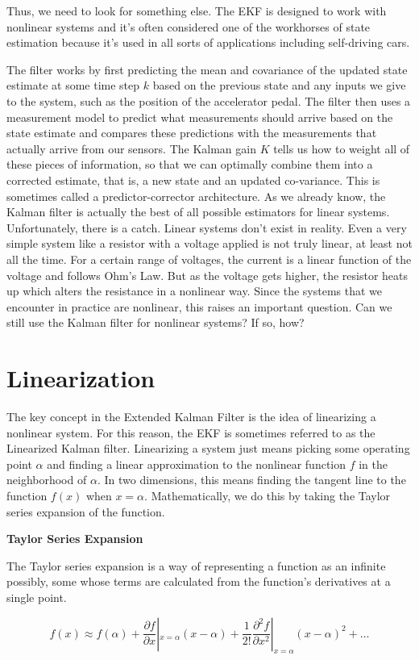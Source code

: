 Thus, we need to look for something else.  The EKF is designed to work with nonlinear systems and it's often
considered one of the workhorses of state estimation because it's used in all sorts of applications
including self-driving cars. 

The filter works by first predicting the mean and covariance of
the updated state estimate at some time step $k$ based on the previous state and any inputs
we give to the system, such as the position of
the accelerator pedal. The filter then uses a
measurement model to predict what measurements
should arrive based on the state estimate and compares
these predictions with the measurements that actually
arrive from our sensors. The Kalman gain $K$ tells us how to weight
all of these pieces of information, so that we can optimally combine
them into a corrected estimate, that is, a new state and
an updated co-variance. This is sometimes called a
predictor-corrector architecture. As we already know, the Kalman filter is actually the best of all possible estimators
for linear systems. Unfortunately, there is a catch. Linear systems don't exist in reality. Even a very simple system like a resistor with a voltage
applied is not truly linear, at least not all the time. For a certain range of voltages, the current is a linear function of
the voltage and follows Ohm's Law. But as the voltage gets higher, the resistor heats up which alters
the resistance in a nonlinear way. Since the systems that we encounter
in practice are nonlinear, this raises an important question. Can we still use the Kalman filter
for nonlinear systems? If so, how? 

\section{Linearization}

The key concept in the Extended Kalman Filter is the idea of linearizing
a nonlinear system. For this reason, the EKF is sometimes referred to as the
Linearized Kalman filter. Linearizing a system just means
picking some operating point $\alpha$ and finding a linear approximation to the nonlinear function $f$ in
the neighborhood of $\alpha$. In two dimensions, this means
finding the tangent line to the function $f(x)$ when $x = \alpha$. Mathematically, we do this by taking the Taylor series expansion
of the function. 



\begin{framed}
\theoremstyle{remark}
\begin{remark}{\textbf{Taylor Series Expansion}}

The Taylor series expansion is a way of representing a function
as an infinite possibly, some whose terms are calculated from the function's derivatives
at a single point.


\begin{equation}
f(x) \approx f(\alpha) + \frac{\partial f}{\partial x}|_{x=\alpha} (x-\alpha) + \frac{1}{2!}\frac{\partial^2 f}{\partial x^2}|_{x=\alpha} (x-\alpha)^2 + \ldots
\end{equation}

\end{remark}
\end{framed}

